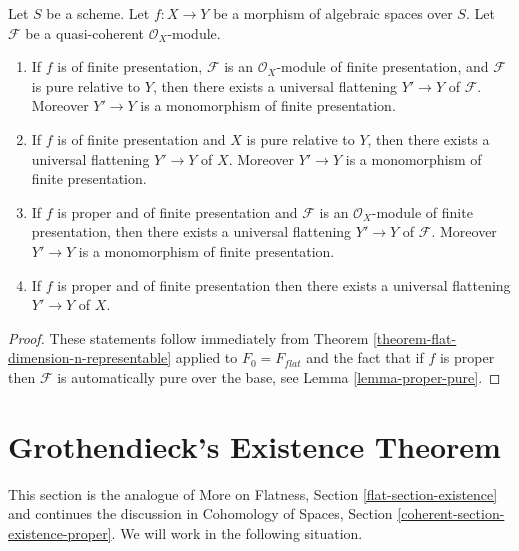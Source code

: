\begin{lemma}
\label{lemma-when-universal-flattening}
Let $S$ be a scheme.
Let $f : X \to Y$ be a morphism of algebraic spaces over $S$.
Let $\mathcal{F}$ be a quasi-coherent $\mathcal{O}_X$-module.
\begin{enumerate}
\item If $f$ is of finite presentation, $\mathcal{F}$ is an
$\mathcal{O}_X$-module of finite presentation, and $\mathcal{F}$ is
pure relative to $Y$, then there exists a universal flattening
$Y' \to Y$ of $\mathcal{F}$. Moreover $Y' \to Y$ is a monomorphism
of finite presentation.
\item If $f$ is of finite presentation and $X$ is pure relative to $Y$,
then there exists a universal flattening $Y' \to Y$ of $X$.
Moreover $Y' \to Y$ is a monomorphism of finite presentation.
\item If $f$ is proper and of finite presentation and $\mathcal{F}$ is an
$\mathcal{O}_X$-module of finite presentation, then there exists a
universal flattening $Y' \to Y$ of $\mathcal{F}$. Moreover $Y' \to Y$ is
a monomorphism of finite presentation.
\item If $f$ is proper and of finite presentation
then there exists a universal flattening $Y' \to Y$ of $X$.
\end{enumerate}
\end{lemma}

\begin{proof}
These statements follow immediately from
Theorem \ref{theorem-flat-dimension-n-representable}
applied to $F_0 = F_{flat}$
and the fact that if $f$ is proper then $\mathcal{F}$ is automatically
pure over the base, see
Lemma \ref{lemma-proper-pure}.
\end{proof}






\section{Grothendieck's Existence Theorem}
\label{section-existence}

\noindent
This section is the analogue of
More on Flatness, Section \ref{flat-section-existence}
and continues the discussion in
Cohomology of Spaces, Section \ref{coherent-section-existence-proper}.
We will work in the following situation.

